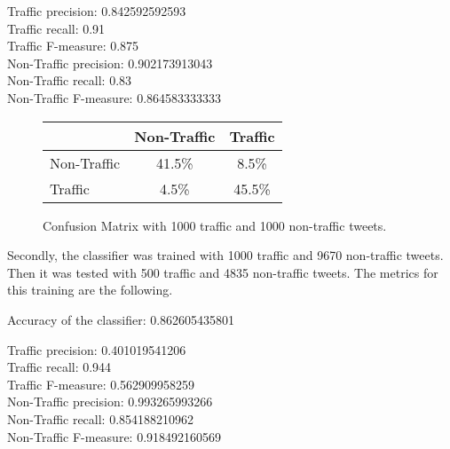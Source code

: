 Traffic precision:\hspace{15.5 mm}              0.842592592593\\
Traffic recall:\hspace{21.2 mm}                             0.91\\
Traffic F-measure:\hspace{12.8 mm}             0.875\\

Non-Traffic precision:\hspace{7.2 mm}        0.902173913043\\
Non-Traffic recall:\hspace{13 mm}            0.83\\
Non-Traffic F-measure:\hspace{4.6 mm}       0.864583333333\\

\begin{figure}[h]
\begin{center}
    \begin{tabular}{| l || c | c | }
    \hline
          & Non-Traffic & Traffic \\ \hline \hline
         Non-Traffic & 41.5\% & 8.5\% \\ \hline
         Traffic & 4.5\% & 45.5\% \\ \hline
    \end{tabular}
    \caption{Confusion Matrix with 1000 traffic and 1000 non-traffic tweets.}
    \label{fig:confusionMatrix1}
\end{center}
\end{figure}	

Secondly, the classifier was trained with 1000 traffic and 9670 non-traffic tweets. Then it was tested with 500 traffic and 4835 non-traffic tweets. The metrics for this training are the following. 

Accuracy of the classifier:   0.862605435801

Traffic precision:\hspace{15.5 mm}            0.401019541206\\
Traffic recall:\hspace{21.2 mm}               0.944\\
Traffic F-measure:\hspace{12.8 mm}         0.562909958259\\

Non-Traffic precision:\hspace{7.2 mm}         0.993265993266\\
Non-Traffic recall:\hspace{13 mm}           0.854188210962\\
Non-Traffic F-measure:\hspace{4.6 mm}         0.918492160569\\

